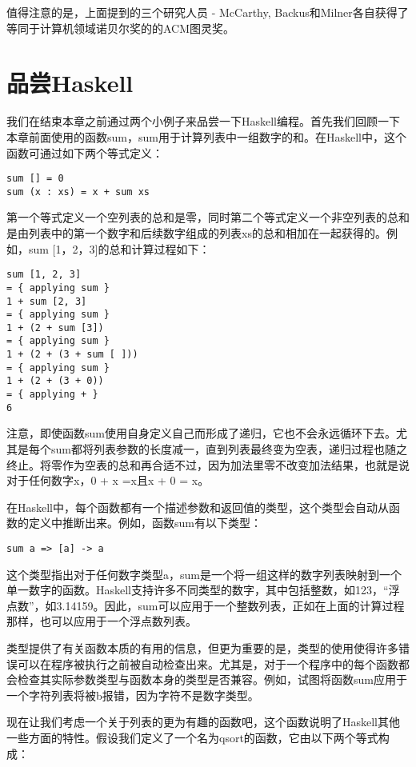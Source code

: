 值得注意的是，上面提到的三个研究人员 - McCarthy, Backus和Milner各自获得了等同于计算机领域诺贝尔奖的的ACM图灵奖。

\section{品尝Haskell}
我们在结束本章之前通过两个小例子来品尝一下Haskell编程。首先我们回顾一下本章前面使用的函数sum，sum用于计算列表中一组数字的和。在Haskell中，这个函数可通过如下两个等式定义：

\begin{verbatim}
sum [] = 0
sum (x : xs) = x + sum xs
\end{verbatim}

第一个等式定义一个空列表的总和是零，同时第二个等式定义一个非空列表的总和是由列表中的第一个数字和后续数字组成的列表xs的总和相加在一起获得的。例如，sum [1，2，3]的总和计算过程如下：

\begin{verbatim}
sum [1, 2, 3]
= { applying sum }
1 + sum [2, 3]
= { applying sum }
1 + (2 + sum [3])
= { applying sum }
1 + (2 + (3 + sum [ ]))
= { applying sum }
1 + (2 + (3 + 0))
= { applying + }
6
\end{verbatim}

注意，即使函数sum使用自身定义自己而形成了递归，它也不会永远循环下去。尤其是每个sum都将列表参数的长度减一，直到列表最终变为空表，递归过程也随之终止。将零作为空表的总和再合适不过，因为加法里零不改变加法结果，也就是说对于任何数字x，0 + x =x且x + 0 = x。

在Haskell中，每个函数都有一个描述参数和返回值的类型，这个类型会自动从函数的定义中推断出来。例如，函数sum有以下类型：
\begin{verbatim}
sum a => [a] -> a
\end{verbatim}

这个类型指出对于任何数字类型a，sum是一个将一组这样的数字列表映射到一个单一数字的函数。Haskell支持许多不同类型的数字，其中包括整数，如123，“浮点数”，如3.14159。因此，sum可以应用于一个整数列表，正如在上面的计算过程那样，也可以应用于一个浮点数列表。

类型提供了有关函数本质的有用的信息，但更为重要的是，类型的使用使得许多错误可以在程序被执行之前被自动检查出来。尤其是，对于一个程序中的每个函数都会检查其实际参数类型与函数本身的类型是否兼容。例如，试图将函数sum应用于一个字符列表将被b报错，因为字符不是数字类型。

现在让我们考虑一个关于列表的更为有趣的函数吧，这个函数说明了Haskell其他一些方面的特性。假设我们定义了一个名为qsort的函数，它由以下两个等式构成：

